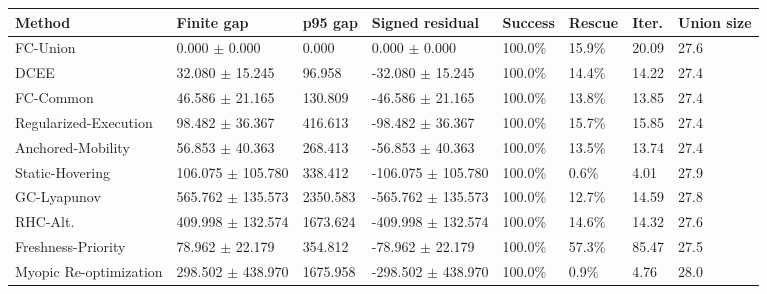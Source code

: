 \begin{tabular}{llllllll}
\toprule
Method & Finite gap & p95 gap & Signed residual & Success & Rescue & Iter. & Union size \\
\midrule
FC-Union & 0.000 $\pm$ 0.000 & 0.000 & 0.000 $\pm$ 0.000 & 100.0\% & 15.9\% & 20.09 & 27.6 \\
DCEE & 32.080 $\pm$ 15.245 & 96.958 & -32.080 $\pm$ 15.245 & 100.0\% & 14.4\% & 14.22 & 27.4 \\
FC-Common & 46.586 $\pm$ 21.165 & 130.809 & -46.586 $\pm$ 21.165 & 100.0\% & 13.8\% & 13.85 & 27.4 \\
Regularized-Execution & 98.482 $\pm$ 36.367 & 416.613 & -98.482 $\pm$ 36.367 & 100.0\% & 15.7\% & 15.85 & 27.4 \\
Anchored-Mobility & 56.853 $\pm$ 40.363 & 268.413 & -56.853 $\pm$ 40.363 & 100.0\% & 13.5\% & 13.74 & 27.4 \\
Static-Hovering & 106.075 $\pm$ 105.780 & 338.412 & -106.075 $\pm$ 105.780 & 100.0\% & 0.6\% & 4.01 & 27.9 \\
GC-Lyapunov & 565.762 $\pm$ 135.573 & 2350.583 & -565.762 $\pm$ 135.573 & 100.0\% & 12.7\% & 14.59 & 27.8 \\
RHC-Alt. & 409.998 $\pm$ 132.574 & 1673.624 & -409.998 $\pm$ 132.574 & 100.0\% & 14.6\% & 14.32 & 27.6 \\
Freshness-Priority & 78.962 $\pm$ 22.179 & 354.812 & -78.962 $\pm$ 22.179 & 100.0\% & 57.3\% & 85.47 & 27.5 \\
Myopic Re-optimization & 298.502 $\pm$ 438.970 & 1675.958 & -298.502 $\pm$ 438.970 & 100.0\% & 0.9\% & 4.76 & 28.0 \\
\bottomrule
\end{tabular}
